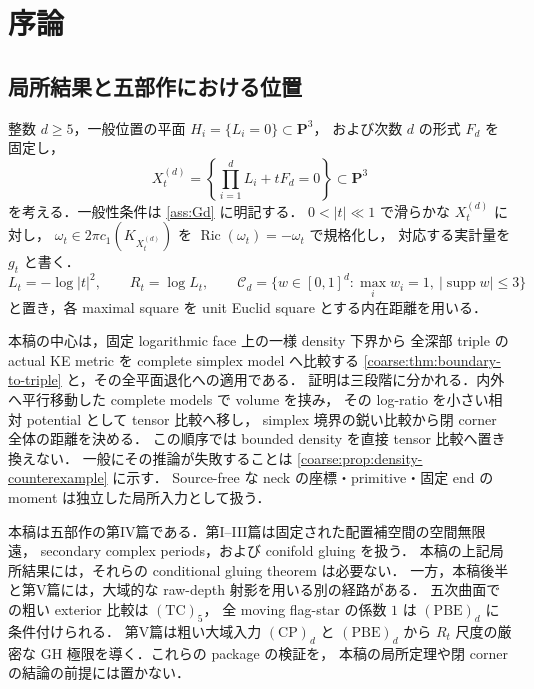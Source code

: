 \documentclass[a4paper,11pt]{ltjsarticle}
\numberwithin{equation}{section}
\theoremstyle{plain}
\theoremstyle{definition}
\theoremstyle{remark}
\newcommand{\PP}{\mathbf P}\newcommand{\CC}{\mathbf C}\newcommand{\RR}{\mathbf R}\newcommand{\ZZ}{\mathbf Z}\newcommand{\NN}{\mathbf N}
\newcommand{\supp}{\operatorname{supp}}\newcommand{\diam}{\operatorname{diam}}\newcommand{\dist}{\operatorname{dist}}
\newcommand{\Ric}{\operatorname{Ric}}\newcommand{\tr}{\operatorname{tr}}\newcommand{\osc}{\operatorname{osc}}\newcommand{\vol}{\operatorname{Vol}}
\begin{document}
\tableofcontents

\section{序論}\label{sec:intro}

\subsection{局所結果と五部作における位置}
整数 $d\ge5$，一般位置の平面 $H_i=\{L_i=0\}\subset\PP^3$，
および次数 $d$ の形式 $F_d$ を固定し，
\[
 X_t^{(d)}=\left\{\prod_{i=1}^dL_i+tF_d=0\right\}\subset\PP^3
\]
を考える．一般性条件は \cref{ass:Gd} に明記する．
$0<|t|\ll1$ で滑らかな $X_t^{(d)}$ に対し，
$\omega_t\in2\pi c_1(K_{X_t^{(d)}})$ を $\Ric(\omega_t)=-\omega_t$ で規格化し，
対応する実計量を $g_t$ と書く．
\[
 L_t=-\log|t|^2,\qquad R_t=\log L_t,
 \qquad
 \mathcal C_d=\{w\in[0,1]^d:\max_iw_i=1,\ |\supp w|\le3\}
\]
と置き，各 maximal square を unit Euclid square とする内在距離を用いる．

本稿の中心は，固定 logarithmic face 上の一様 density 下界から
全深部 triple の actual KE metric を complete simplex model へ比較する
\cref{coarse:thm:boundary-to-triple} と，その全平面退化への適用である．
証明は三段階に分かれる．内外へ平行移動した complete models で volume を挟み，
その log-ratio を小さい相対 potential として tensor 比較へ移し，
simplex 境界の鋭い比較から閉 corner 全体の距離を決める．
この順序では bounded density を直接 tensor 比較へ置き換えない．
一般にその推論が失敗することは \cref{coarse:prop:density-counterexample} に示す．
Source-free な neck の座標・primitive・固定 end の moment は独立した局所入力として扱う．

本稿は五部作の第IV篇である．第I--III篇は固定された配置補空間の空間無限遠，
secondary complex periods，および conifold gluing を扱う．
本稿の上記局所結果には，それらの conditional gluing theorem は必要ない．
一方，本稿後半と第V篇には，大域的な raw-depth 射影を用いる別の経路がある．
五次曲面での粗い exterior 比較は $\mathrm{(TC)}_5$，
全 moving flag-star の係数 $1$ は $\mathrm{(PBE)}_d$ に条件付けられる．
第V篇は粗い大域入力 $\mathrm{(CP)}_d$ と $\mathrm{(PBE)}_d$ から
$R_t$ 尺度の厳密な GH 極限を導く．これらの package の検証を，
本稿の局所定理や閉 corner の結論の前提には置かない．
\end{document}
